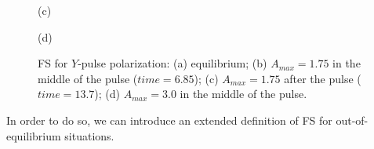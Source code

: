 \begin{figure}[h!]
\begin{minipage}[h]{0.5\linewidth}
\end{minipage}
\begin{minipage}[h]{0.5\linewidth}
 (c) \\
\end{minipage}
\hfill
\begin{minipage}[h]{0.5\linewidth}
 (d) \\
\end{minipage}
\caption{FS for $Y$-pulse polarization: (a) equilibrium; (b) $A_{max}=1.75$ in the middle of the pulse ($time=6.85$); (c) $A_{max}=1.75$ after the pulse ($time=13.7$); (d) $A_{max}=3.0$ in the middle of the pulse.}
\label{fig:FS_sq_latt_Y_field}
\end{figure}
In order to do so, we can introduce an extended definition of FS for out-of-equilibrium situations. 

